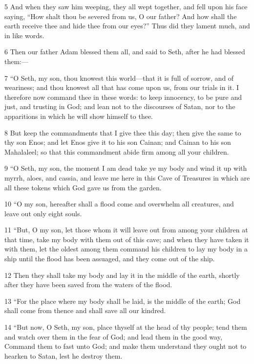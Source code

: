 \par 5 And when they saw him weeping, they all wept together, and fell upon his face saying, “How shalt thou be severed from us, O our father? And how shall the earth receive thee and hide thee from our eyes?” Thus did they lament much, and in like words.

\par 6 Then our father Adam blessed them all, and said to Seth, after he had blessed them:—

\par 7 “O Seth, my son, thou knowest this world—that it is full of sorrow, and of weariness; and thou knowest all that has come upon us, from our trials in it. I therefore now command thee in these words: to keep innocency, to be pure and just, and trusting in God; and lean not to the discourses of Satan, nor to the apparitions in which he will show himself to thee.

\par 8 But keep the commandments that I give thee this day; then give the same to thy son Enos; and let Enos give it to his son Cainan; and Cainan to his son Mahalaleel; so that this commandment abide firm among all your children.

\par 9 “O Seth, my son, the moment I am dead take ye my body and wind it up with myrrh, aloes, and cassia, and leave me here in this Cave of Treasures in which are all these tokens which God gave us from the garden.

\par 10 “O my son, hereafter shall a flood come and overwhelm all creatures, and leave out only eight souls.

\par 11 “But, O my son, let those whom it will leave out from among your children at that time, take my body with them out of this cave; and when they have taken it with them, let the oldest among them command his children to lay my body in a ship until the flood has been assuaged, and they come out of the ship.

\par 12 Then they shall take my body and lay it in the middle of the earth, shortly after they have been saved from the waters of the flood.

\par 13 “For the place where my body shall be laid, is the middle of the earth; God shall come from thence and shall save all our kindred.

\par 14 “But now, O Seth, my son, place thyself at the head of thy people; tend them and watch over them in the fear of God; and lead them in the good way, Command them to fast unto God; and make them understand they ought not to hearken to Satan, lest he destroy them.

